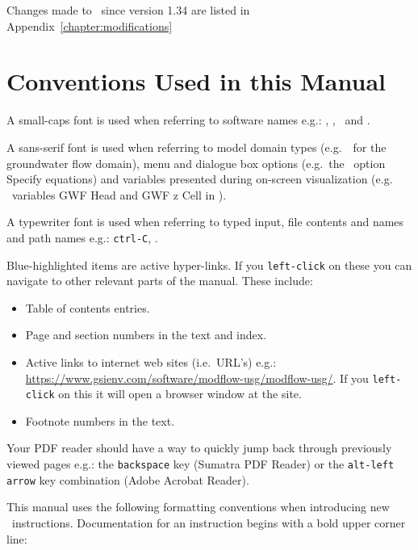 Changes made to \mut\  since version 1.34 are listed in Appendix~\ref{chapter:modifications}

\section{Conventions Used in this Manual} \label{section:AboutManual}

A small-caps font is used when referring to software names e.g.: \mut, \mfus, \tecplot\ and \windows.

A sans-serif font is used when referring to model domain types (e.g.\ \gwf\ for the groundwater flow domain), menu and dialogue box options (e.g.\ the \tecplot\ option {\sf Specify equations}) and variables presented during on-screen visualization (e.g. \mut\ variables  {\sf GWF Head} and {\sf GWF z Cell} in \tecplot).

A typewriter font is used when referring to typed input, file contents and names  and path names e.g.: {\tt ctrl-C}, .

Blue-highlighted items are active hyper-links.  If you {\tt left-click} on these you can navigate to other relevant parts of the manual.  These include:
\begin{itemize}
    \item Table of contents entries.
    \item Page and section numbers in the text and index.
    \item Active links to internet web sites (i.e.\ URL's) e.g.:  \url{https://www.gsienv.com/software/modflow-usg/modflow-usg/}.  If you {\tt left-click} on this it will open a browser window at the site.
    \item Footnote numbers in the text.
\end{itemize}
Your PDF reader should have a way to quickly jump back through previously viewed pages e.g.:  the {\tt backspace} key ({\sc Sumatra} PDF Reader) or the {\tt alt-left arrow} key combination ({\sc Adobe Acrobat Reader}).

This manual uses the following formatting conventions when introducing new \mut\ instructions. Documentation for an instruction begins with a bold upper corner line:

